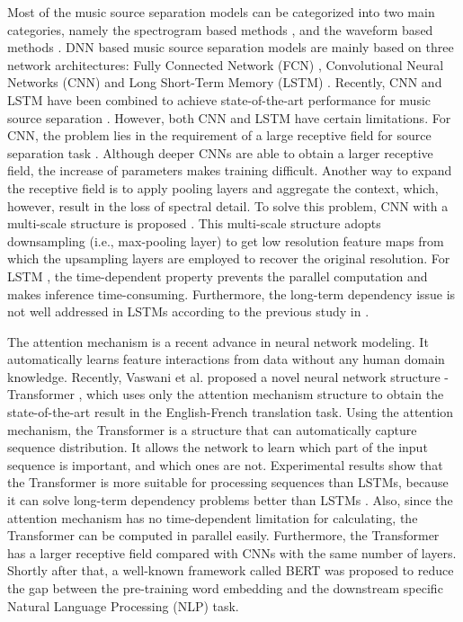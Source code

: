 \documentclass[a4paper]{article}
\begin{document}
Most of the music source separation models can be categorized into two main categories, namely the spectrogram based methods \cite{huang2014singing, jansson2017singing, stoter2019open}, and the waveform based methods \cite{oord2016wavenet, stoller2018wave, Demucs2019}. DNN based music source separation models are mainly based on three network architectures: Fully Connected Network (FCN) \cite{simpson2015deep}, Convolutional Neural Networks (CNN) \cite{jansson2017singing, stoller2018wave} and Long Short-Term Memory (LSTM) \cite{huang2014singing}. Recently, CNN and LSTM have been combined to achieve state-of-the-art performance for music source separation \cite{Demucs2019, takahashi2018mmdenselstm}. However, both CNN and LSTM have certain limitations. For CNN, the problem lies in the requirement of a large receptive field for source separation task \cite{luo2016understanding}. Although deeper CNNs are able to obtain a larger receptive field, the increase of parameters makes training difficult. Another way to expand the receptive field is to apply pooling layers and aggregate the context, which, however, result in the loss of spectral detail. To solve this problem, CNN with a multi-scale structure is proposed \cite{stoller2018wave}. This multi-scale structure adopts downsampling (i.e., max-pooling layer) to get low resolution feature maps from which the upsampling layers are employed to recover the original resolution. For LSTM \cite{stoter2019open}, the time-dependent property prevents the parallel computation and makes inference time-consuming. Furthermore, the long-term dependency issue is not well addressed in LSTMs according to the previous study in \cite{hochreiter2001gradient}.

The attention mechanism \cite{bahdanau2014neural} is a recent advance in neural network modeling. It automatically learns feature interactions from data without any human domain knowledge. Recently, Vaswani et al. proposed a novel neural network structure - Transformer \cite{vaswani2017attention}, which uses only the attention mechanism structure to obtain the state-of-the-art result in the English-French translation task. Using the attention mechanism, the Transformer is a structure that can automatically capture sequence distribution. It allows the network to learn which part of the input sequence is important, and which ones are not. Experimental results show that the Transformer is more suitable for processing sequences than LSTMs, because it can solve long-term dependency problems better than LSTMs \cite{vaswani2017attention}. Also, since the attention mechanism has no time-dependent limitation for calculating, the Transformer can be computed in parallel easily. Furthermore, the Transformer has a larger receptive field compared with CNNs with the same number of layers. Shortly after that, a well-known framework called BERT \cite{devlin2018bert} was proposed to reduce the gap between the pre-training word embedding and the downstream specific Natural Language Processing (NLP) task.
\end{document}
